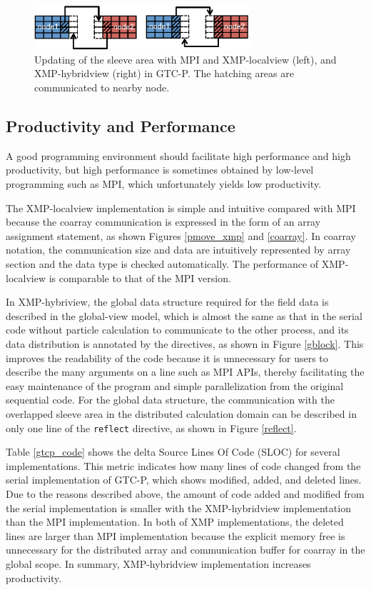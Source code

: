 \begin{figure}[t]
\begin{center}
\includegraphics[width=8cm, bb=0 0 464 94]{./figure/sleeve.pdf}
\caption{Updating of the sleeve area with MPI and XMP-localview (left), and XMP-hybridview (right) in GTC-P. The hatching areas are communicated to nearby node.}
\label{sleeve}
\end{center}
\end{figure}


\subsection{Productivity and Performance}
A good programming environment should facilitate high performance and high productivity, but high performance is sometimes obtained by low-level programming such as MPI, which unfortunately yields low productivity. 

The XMP-localview implementation is simple and intuitive compared with MPI because the coarray communication is expressed in the form of an array assignment statement, as shown Figures \ref{pmove_xmp} and \ref{coarray}. In coarray notation, the communication size and data are intuitively represented by array section and the data type is checked automatically. The performance of XMP-localview is comparable to that of the MPI version. 

In XMP-hybriview, the global data structure required for the field data is described in the global-view model, which is almost the same as that in the serial code without particle calculation to communicate to the other process, and its data distribution is annotated by the directives, as shown in Figure \ref{gblock}. This improves the readability of the code because it is unnecessary for users to describe the many arguments on a line such as MPI APIs, thereby facilitating the easy maintenance of the program and simple parallelization from the original sequential code. For the global data structure, the communication with the overlapped sleeve area in the distributed calculation domain can be described in only one line of the {\tt reflect} directive, as shown in Figure \ref{reflect}.

Table \ref{gtcp_code} shows the delta Source Lines Of Code (SLOC) \cite{SLOC} for several implementations. This metric indicates how many lines of code changed from the serial implementation of GTC-P, which shows modified, added, and deleted lines. Due to the reasons described above, the amount of code added and modified from the serial implementation is smaller with the XMP-hybridview implementation than the MPI implementation. In both of XMP implementations, the deleted lines are larger than MPI implementation because the explicit memory free is unnecessary for the distributed array and communication buffer for coarray in the global scope. In summary, XMP-hybridview implementation increases productivity.

